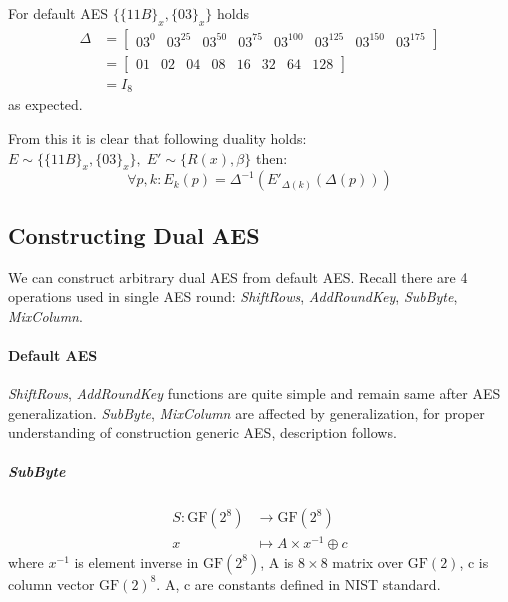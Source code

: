 \documentclass[11pt,oneside,final]{fithesis2}
\newcommand{\gfe}{\ensuremath{\text{GF}\left(2^8\right)}}
\begin{document}
	For default AES $\{\{11B\}_x, \{03\}_x\}$ holds
	\begin{align*}
	    \Delta &= \begin{bmatrix} 03^0 & 03^{25} & 03^{50} & 03^{75} & 03^{100} & 03^{125} & 03^{150} & 03^{175}  \end{bmatrix} \\
	           &= \begin{bmatrix} 01 & 02 & 04 & 08 & 16 & 32 & 64 & 128 \end{bmatrix} \\
		   &= I_8
	\end{align*}
	as expected.

	From this it is clear that following duality holds: $E \sim \{\{11B\}_x, \{03\}_x\}, \; E' \sim \{R(x), \beta \}$ then:
	\begin{equation} 
	\forall p, k: E_k(p) = \Delta^{-1}\left(E'_{\Delta(k)}(\Delta(p))\right)
	\end{equation}

	\subsection{Constructing Dual AES}
	We can construct arbitrary dual AES from default AES. Recall there are 4 operations used in single AES round: \emph{ShiftRows}, \emph{AddRoundKey}, \emph{SubByte}, \emph{MixColumn}.

	\paragraph*{Default AES}
	\emph{ShiftRows}, \emph{AddRoundKey} functions are quite simple and remain same after AES generalization. \emph{SubByte}, \emph{MixColumn} are affected by 
	generalization, for proper understanding of construction generic AES, description follows.

	\subparagraph*{SubByte}\label{sec:aes_subbyte}
	\begin{equation}
	\begin{aligned}
	S: \gfe         & \longrightarrow  \gfe\\
	x               & \longmapsto A \times x^{-1} \oplus c
	\end{aligned}
	\end{equation}
	where $x^{-1}$ is element inverse in $\gfe$, A is $8 \times 8$ matrix over $\text{GF}(2)$, c is column vector $\text{GF}(2)^8$. A, c are constants defined in NIST standard.
\end{document}
